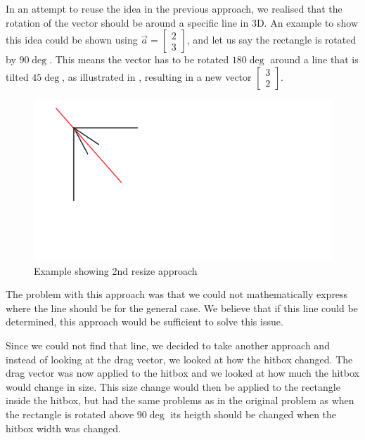 In an attempt to reuse the idea in the previous approach, we realised that the rotation of the vector should be around a specific line in 3D.
An example to show this idea could be shown using $\vec{a} =
\begin{bmatrix}
2 \\ 3
\end{bmatrix}$, and let us say the rectangle is rotated by $90\deg$.
This means the vector has to be rotated $180\deg$ around a line that is tilted $45\deg$, as illustrated in , resulting in a new vector 
$\begin{bmatrix}
3 \\ 2
\end{bmatrix}$.
\begin{figure}
\includegraphics[scale=0.5]{media/approach2}
\caption{Example showing 2nd resize approach}
\label{fig:app2}
\end{figure}
The problem with this approach was that we could not mathematically express where the line should be  for the general case.
We believe that if this line could be determined, this approach would be sufficient to solve this issue.

Since we could not find that line, we decided to take another approach and instead of looking at the drag vector, we looked at how the hitbox changed. 
The drag vector was now applied to the hitbox and we looked at how much the hitbox would change in size.
This size change would then be applied to the rectangle inside the hitbox, but had the same problems as in the original problem as when the rectangle is rotated above $90\deg$ its heigth should be changed when the hitbox width was changed.

